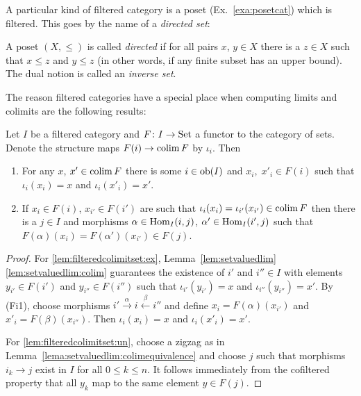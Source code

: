 \documentclass[a4paper,openany]{scrbook}
\begin{document}
A particular kind of filtered category is a poset (Ex.~\ref{exa:posetcat}) which is filtered. This goes by the name of a \emph{directed set}:

\begin{defn}
A poset $(X,\leq)$ is called \emph{directed} if for all pairs $x$, $y \in X$ there is a $z \in X$ such that $x \leq z$ and $y \leq z$ (in other words, if any finite subset has an upper bound). The dual notion is called an \emph{inverse set}.
\end{defn}

The reason filtered categories have a special place when computing limits and colimits are the following results:

\begin{lemma} \label{lem:filteredcolimitset}
Let $I$ be a filtered category and $F\colon I \to \operatorname{Set}$ a functor to the category of sets. Denote the structure maps $F(i) \to \operatorname*{colim} F$ by $\iota_i$. Then
\begin{enumerate}
\item For any $x$, $x' \in \operatorname*{colim} F$ there is some $i \in \operatorname{ob}(I)$ and $x_i,\; x'_i \in F(i)$ such that $\iota_i(x_i)=x$ and $\iota_i(x'_i)=x'$. \label{lem:filteredcolimitset:ex}
\item If $x_i \in F(i)$, $x_{i'} \in F(i')$ are such that $\iota_i(x_i) = \iota_{i'}(x_{i'}) \in \operatorname*{colim} F$ then there is a $j \in I$ and morphisms $\alpha \in \operatorname{Hom}_I(i,j)$, $\alpha' \in \operatorname{Hom}_I(i',j)$ such that $F(\alpha)(x_i) = F(\alpha')(x_{i'}) \in F(j)$. \label{lem:filteredcolimitset:un}
\end{enumerate}
\end{lemma}
\begin{proof}
For \eqref{lem:filteredcolimitset:ex}, Lemma~\ref{lem:setvaluedlim}\eqref{lem:setvaluedlim:colim} guarantees the existence of $i'$ and $i'' \in I$ with elements $y_{i'} \in F(i')$ and $y_{i''} \in F(i'')$ such that $\iota_{i'}(y_{i'}) = x$ and $\iota_{i''}(y_{i''}) = x'$. By (Fi1), choose morphisms $i' \xrightarrow{\alpha} i \xleftarrow{\beta} i''$ and define $x_i = F(\alpha)(x_{i'})$ and $x'_i = F(\beta)(x_{i''})$. Then $\iota_i(x_i)=x$ and $\iota_i(x'_i)=x'$.

For \eqref{lem:filteredcolimitset:un}, choose a zigzag as in Lemma~\ref{lema:setvaluedlim:colimequivalence} and choose $j$ such that morphisms $i_k \to j$ exist in $I$ for all $0 \leq k \leq n$. It follows immediately from the cofiltered property that all $y_{k}$ map to the same element $y \in F(j)$.
\end{proof}
\end{document}
